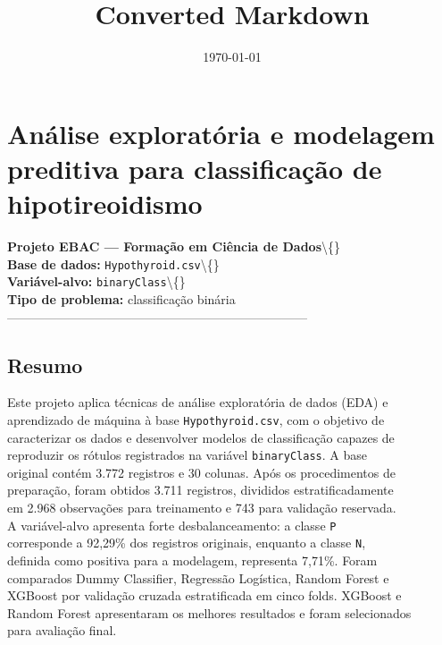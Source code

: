 \documentclass{article}
\title{Converted Markdown}
\author{}
\date{\today}
\begin{document}
\maketitle

\section{Análise exploratória e modelagem preditiva para classificação de hipotireoidismo}

\textbf{Projeto EBAC --- Formação em Ciência de Dados}\textbackslash\{\} \\
\textbf{Base de dados:} \texttt{Hypothyroid.csv}\textbackslash\{\} \\
\textbf{Variável-alvo:} \texttt{binaryClass}\textbackslash\{\} \\
\textbf{Tipo de problema:} classificação binária \\

------------------------------------------------------------------------ \\

\subsection{Resumo}

Este projeto aplica técnicas de análise exploratória de dados (EDA) e \\
aprendizado de máquina à base \texttt{Hypothyroid.csv}, com o objetivo de \\
caracterizar os dados e desenvolver modelos de classificação capazes de \\
reproduzir os rótulos registrados na variável \texttt{binaryClass}. A base \\
original contém 3.772 registros e 30 colunas. Após os procedimentos de \\
preparação, foram obtidos 3.711 registros, divididos estratificadamente \\
em 2.968 observações para treinamento e 743 para validação reservada. \\

A variável-alvo apresenta forte desbalanceamento: a classe \texttt{P} \\
corresponde a 92,29\% dos registros originais, enquanto a classe \texttt{N}, \\
definida como positiva para a modelagem, representa 7,71\%. Foram \\
comparados Dummy Classifier, Regressão Logística, Random Forest e \\
XGBoost por validação cruzada estratificada em cinco folds. XGBoost e \\
Random Forest apresentaram os melhores resultados e foram selecionados \\
para avaliação final. \\
\end{document}
